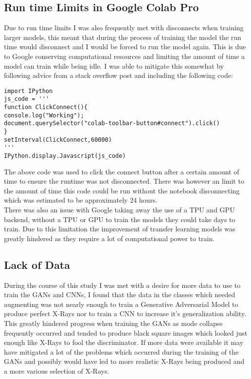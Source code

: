 \subsection{Run time Limits in Google Colab Pro}
Due to run time limits I was also frequently met with disconnects when training larger models, this meant that during the process of training the model the run time would disconnect and I would be forced to run the model again.  This is due to Google conserving computational resources and limiting the amount of time a model can train while being idle.  I was able to mitigate this somewhat by following advice from a stack overflow post and including the following code:
\begin{verbatim}
import IPython
js_code = '''
function ClickConnect(){
console.log("Working");
document.querySelector("colab-toolbar-button#connect").click()
}
setInterval(ClickConnect,60000)
'''
IPython.display.Javascript(js_code)
\end{verbatim}
The above code was used to click the connect button after a certain amount of time to ensure the runtime was not disconnected.  There was however an limit to the amount of time this code could be run without the notebook disconnecting which was estimated to be approximately 24 hours.
\\
There was also an issue with Google taking away the use of a TPU and GPU backend, without a TPU or GPU to train the models they could take days to train.  Due to this limitation the improvement of transfer learning models was greatly hindered as they require a lot of computational power to train.
\subsection{Lack of Data}
During the course of this study I was met with a desire for more data to use to train the GANs and CNNs, I found that the data in the classes which needed augmenting was not nearly enough to train a Generative Adversarial Model to produce perfect X-Rays nor to train a CNN to increase it's generalization ability.  This greatly hindered progress when training the GANs as mode collapse frequently occurred and tended to produce black square images which looked just enough like X-Rays to fool the discriminator.  If more data were available it may have mitigated a lot of the problems which occurred during the training of the GANs and possibly would have led to more realistic X-Rays being produced and a more various selection of X-Rays.  
